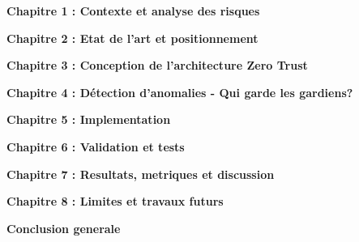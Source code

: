 \documentclass[12pt,a4paper,twoside]{report}
\newcommand{\chapterpage}[1]{%
  \clearpage
  \thispagestyle{empty}
  \vspace*{\fill}
  \begin{flushleft}
    {\huge\bfseries #1}
  \end{flushleft}
  \vspace*{\fill}
  \clearpage
}
\begin{document}
\setcounter{page}{1}

\chapterpage{Chapitre 1 : Contexte et analyse des risques}

\chapterpage{Chapitre 2 : Etat de l'art et positionnement}

\chapterpage{Chapitre 3 : Conception de l'architecture Zero Trust}

\chapterpage{Chapitre 4 : Détection d'anomalies - Qui garde les gardiens?}

\chapterpage{Chapitre 5 : Implementation}

\chapterpage{Chapitre 6 : Validation et tests}

\chapterpage{Chapitre 7 : Resultats, metriques et discussion}


\chapterpage{Chapitre 8 : Limites et travaux futurs}

\chapterpage{Conclusion generale}


\end{document}
